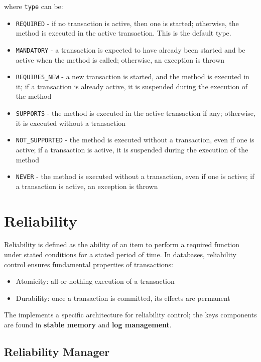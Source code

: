 \documentclass[english]{article}
\begin{document}
where \texttt{type} can be:

\begin{itemize}[label=\texttt{>}]
  \item \texttt{REQUIRED} - if no transaction is active, then one is started; otherwise, the method is executed in the active transaction. This is the default type.
  \item \texttt{MANDATORY} - a transaction is expected to have already been started and be active when the method is called; otherwise, an exception is thrown
  \item \texttt{REQUIRES\_NEW} - a new transaction is started, and the method is executed in it; if a transaction is already active, it is suspended during the execution of the method
  \item \texttt{SUPPORTS} - the method is executed in the active transaction if any; otherwise, it is executed without a transaction
  \item \texttt{NOT\_SUPPORTED} - the method is executed without a transaction, even if one is active; if a transaction is active, it is suspended during the execution of the method
  \item \texttt{NEVER} - the method is executed without a transaction, even if one is active; if a transaction is active, an exception is thrown
\end{itemize}

\clearpage

\section{Reliability}

Reliability is defined as the ability of an item to perform a required function under stated conditions for a stated period of time.
In databases, reliability control ensures fundamental properties of transactions:

\begin{itemize}
  \item Atomicity: all-or-nothing execution of a transaction
  \item Durability: once a transaction is committed, its effects are permanent
\end{itemize}

The \dbms implements a specific architecture for reliability control;
the keys components are found in \textbf{stable memory} and \textbf{log management}.

\subsection{Reliability Manager}
\end{document}
